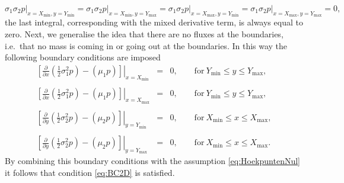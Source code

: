 \documentclass[10pt]{article}
\begin{document}
\begin{equation}
\sigma_{1}\sigma_{2}p \vert_{x=X_{\min},y=Y_{\min}} = \sigma_{1}\sigma_{2}p \vert_{x=X_{\min},y=Y_{\max}} = \sigma_{1}\sigma_{2}p \vert_{x=X_{\max},y=Y_{\min}} = \sigma_{1}\sigma_{2}p \vert_{x=X_{\max},y=Y_{\max}} =0,
\label{eq:HoekpuntenNul}
\end{equation}
the last integral, corresponding with the mixed derivative term, is always equal to zero.
Next, we generalise the idea that there are no fluxes at the boundaries, i.e.\ that no mass is coming in or going out at the boundaries.
In this way the following boundary conditions are imposed
\begin{eqnarray*}
\left. \left[ \tfrac{\partial}{\partial x} \left( \tfrac{1}{2} \sigma_{1}^{2}p \right) - \left( \mu_{1} p \right) \right]\right\vert_{x=X_{\min}} &=& 0, \qquad \mathrm{for} \ Y_{\min} \le y \le Y_{\max}, \\\\
\left. \left[ \tfrac{\partial}{\partial x} \left( \tfrac{1}{2} \sigma_{1}^{2}p \right) - \left( \mu_{1} p \right) \right]\right\vert_{x=X_{\max}} &=& 0, \qquad \mathrm{for} \ Y_{\min} \le y \le Y_{\max}, \\\\
\left. \left[ \tfrac{\partial}{\partial y} \left( \tfrac{1}{2} \sigma_{2}^{2}p \right) - \left( \mu_{2} p \right) \right]\right\vert_{y=Y_{\min}} &=& 0, \qquad \mathrm{for} \ X_{\min} \le x \le X_{\max}, \\\\
\left. \left[ \tfrac{\partial}{\partial y} \left( \tfrac{1}{2} \sigma_{2}^{2}p \right) - \left( \mu_{2} p \right) \right]\right\vert_{y=Y_{\max}} &=& 0, \qquad \mathrm{for} \ X_{\min} \le x \le X_{\max}.
\end{eqnarray*}
By combining this boundary conditions with the assumption \eqref{eq:HoekpuntenNul} it follows that condition \eqref{eq:BC2D} is satisfied.
\end{document}
